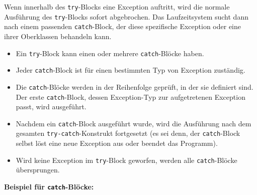 Wenn innerhalb des \texttt{try}-Blocks eine Exception auftritt, wird die normale Ausführung des \texttt{try}-Blocks sofort abgebrochen. Das Laufzeitsystem sucht dann nach einem passenden \texttt{catch}-Block, der diese spezifische Exception oder eine ihrer Oberklassen behandeln kann.

\begin{itemize}
    \item Ein \texttt{try}-Block kann einen oder mehrere \texttt{catch}-Blöcke haben.
    \item Jeder \texttt{catch}-Block ist für einen bestimmten Typ von Exception zuständig.
    \item Die \texttt{catch}-Blöcke werden in der Reihenfolge geprüft, in der sie definiert sind. Der erste \texttt{catch}-Block, dessen Exception-Typ zur aufgetretenen Exception passt, wird ausgeführt.
    \item Nachdem ein \texttt{catch}-Block ausgeführt wurde, wird die Ausführung nach dem gesamten \texttt{try-catch}-Konstrukt fortgesetzt (es sei denn, der \texttt{catch}-Block selbst löst eine neue Exception aus oder beendet das Programm).
    \item Wird keine Exception im \texttt{try}-Block geworfen, werden alle \texttt{catch}-Blöcke übersprungen.
\end{itemize}

\textbf{Beispiel für \texttt{catch}-Blöcke:}

